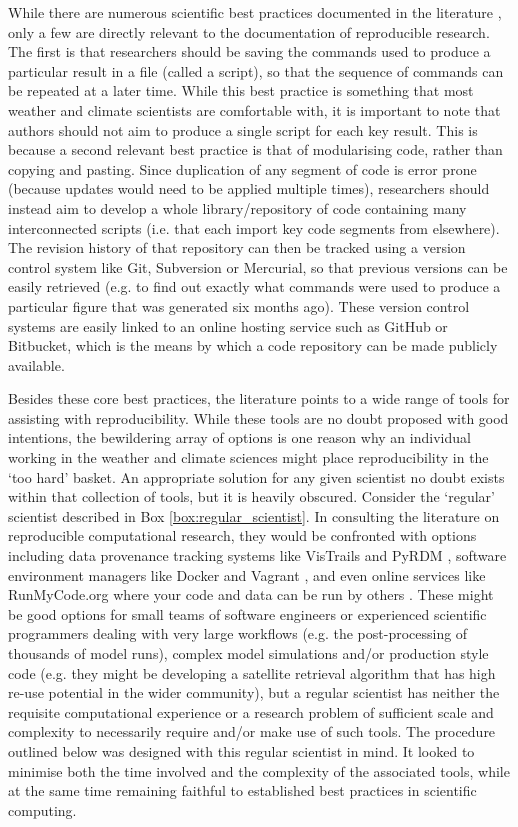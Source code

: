 While there are numerous scientific best practices documented in the literature \citep[e.g.][]{Wilson2014a}, only a few are directly relevant to the documentation of reproducible research. The first is that researchers should be saving the commands used to produce a particular result in a file (called a script), so that the sequence of commands can be repeated at a later time. While this best practice is something that most weather and climate scientists are comfortable with, it is important to note that authors should not aim to produce a single script for each key result. This is because a second relevant best practice is that of modularising code, rather than copying and pasting. Since duplication of any segment of code is error prone (because updates would need to be applied multiple times), researchers should instead aim to develop a whole library/repository of code containing many interconnected scripts (i.e. that each import key code segments from elsewhere). The revision history of that repository can then be tracked using a version control system like Git, Subversion or Mercurial, so that previous versions can be easily retrieved (e.g. to find out exactly what commands were used to produce a particular figure that was generated six months ago). These version control systems are easily linked to an online hosting service such as GitHub or Bitbucket, which is the means by which a code repository can be made publicly available.

Besides these core best practices, the literature points to a wide range of tools for assisting with reproducibility. While these tools are no doubt proposed with good intentions, the bewildering array of options is one reason why an individual working in the weather and climate sciences might place reproducibility in the `too hard' basket. An appropriate solution for any given scientist no doubt exists within that collection of tools, but it is heavily obscured. Consider the `regular' scientist described in Box \ref{box:regular_scientist}. In consulting the literature on reproducible computational research, they would be confronted with options including data provenance tracking systems like VisTrails \citep{Freire2012} and PyRDM \citep{Jacobs2014}, software environment managers like Docker and Vagrant \citep{Stodden2014}, and even online services like RunMyCode.org where your code and data can be run by others \citep{Stodden2012}. These might be good options for small teams of software engineers or experienced scientific programmers dealing with very large workflows (e.g. the post-processing of thousands of model runs), complex model simulations and/or production style code (e.g. they might be developing a satellite retrieval algorithm that has high re-use potential in the wider community), but a regular scientist has neither the requisite computational experience or a research problem of sufficient scale and complexity to necessarily require and/or make use of such tools. The procedure outlined below was designed with this regular scientist in mind. It looked to minimise both the time involved and the complexity of the associated tools, while at the same time remaining faithful to established best practices in scientific computing.


